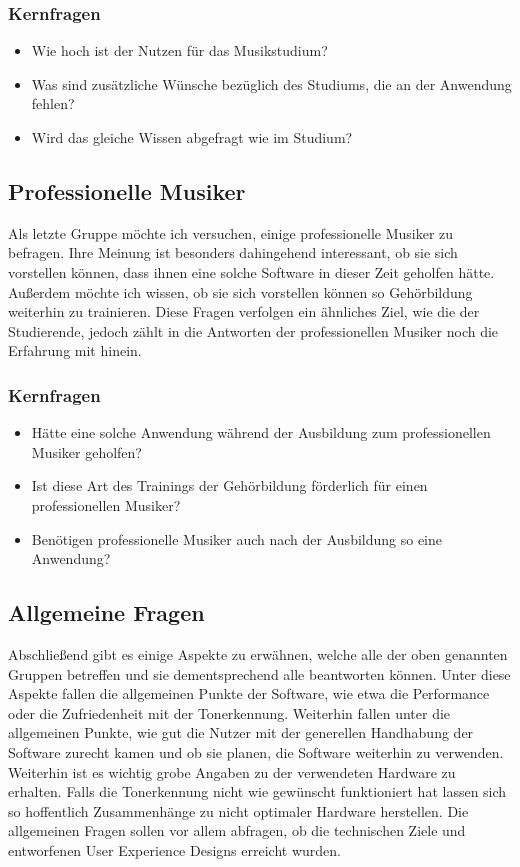 \subsubsection*{Kernfragen}
\begin{itemize}
    \item Wie hoch ist der Nutzen für das Musikstudium?
    \item Was sind zusätzliche Wünsche bezüglich des Studiums, die an der Anwendung fehlen?
    \item Wird das gleiche Wissen abgefragt wie im Studium?
\end{itemize}

\subsection{Professionelle Musiker}
Als letzte Gruppe möchte ich versuchen, einige professionelle Musiker zu befragen. Ihre Meinung ist besonders dahingehend interessant, ob sie sich vorstellen können, dass ihnen eine solche Software in dieser Zeit geholfen hätte. Außerdem möchte ich wissen, ob sie sich vorstellen können so Gehörbildung weiterhin zu trainieren. Diese Fragen verfolgen ein ähnliches Ziel, wie die der Studierende, jedoch zählt in die Antworten der professionellen Musiker noch die Erfahrung mit hinein.   
\subsubsection*{Kernfragen}
\begin{itemize}
    \item Hätte eine solche Anwendung während der Ausbildung zum professionellen Musiker geholfen? 
    \item Ist diese Art des Trainings der Gehörbildung förderlich für einen professionellen Musiker?
    \item Benötigen professionelle Musiker auch nach der Ausbildung so eine Anwendung?
\end{itemize}

\subsection{Allgemeine Fragen}
Abschließend gibt es einige Aspekte zu erwähnen, welche alle der oben genannten Gruppen betreffen und sie dementsprechend alle beantworten können. Unter diese Aspekte fallen die allgemeinen Punkte der Software, wie etwa die Performance oder die Zufriedenheit mit der Tonerkennung. Weiterhin fallen unter die allgemeinen Punkte, wie gut die Nutzer mit der generellen Handhabung der Software zurecht kamen und ob sie planen, die Software weiterhin zu verwenden. Weiterhin ist es wichtig grobe Angaben zu der verwendeten Hardware zu erhalten. Falls die Tonerkennung nicht wie gewünscht funktioniert hat lassen sich so hoffentlich Zusammenhänge zu nicht optimaler Hardware herstellen. Die allgemeinen Fragen sollen vor allem abfragen, ob die technischen Ziele und entworfenen User Experience Designs erreicht wurden.
